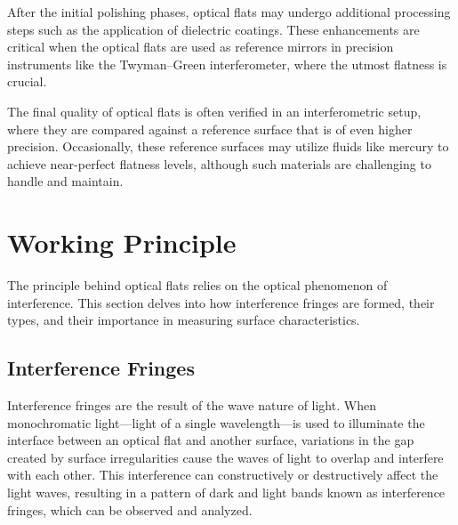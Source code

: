 \documentclass[../main.tex]{subfiles}
\begin{document}
After the initial polishing phases, optical flats may undergo additional processing steps such as the application of dielectric coatings. These enhancements are critical when the optical flats are used as reference mirrors in precision instruments like the Twyman–Green interferometer, where the utmost flatness is crucial.\cite{Paschottaoptical_flats}

The final quality of optical flats is often verified in an interferometric setup, where they are compared against a reference surface that is of even higher precision. Occasionally, these reference surfaces may utilize fluids like mercury to achieve near-perfect flatness levels, although such materials are challenging to handle and maintain.\cite{Paschottaoptical_flats}

\vspace{-15pt}

\section{Working Principle}

\vspace{-15pt}

The principle behind optical flats relies on the optical phenomenon of interference. This section delves into how interference fringes are formed, their types, and their importance in measuring surface characteristics.
\vspace{-15pt}
\subsection{Interference Fringes}
\vspace{-15pt}
Interference fringes are the result of the wave nature of light. When monochromatic light—light of a single wavelength—is used to illuminate the interface between an optical flat and another surface, variations in the gap created by surface irregularities cause the waves of light to overlap and interfere with each other. This interference can constructively or destructively affect the light waves, resulting in a pattern of dark and light bands known as interference fringes, which can be observed and analyzed.
\end{document}
